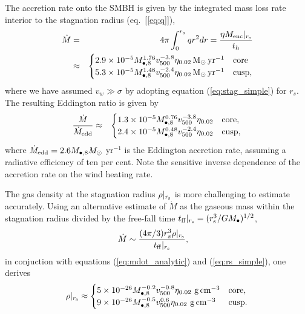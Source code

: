 \documentclass[usenatbib,fleqn]{mn2e}
\newcommand{\rs}{r_s}
\newcommand{\Menc}{M_{\rm enc}}
\newcommand{\Mbheight}{M_{\bullet,8}}
\newcommand{\pyear}{{\rm yr}^{-1}}
\renewcommand{\th}{t_h}
\newcommand{\tff}{t_{\rm ff}}
\begin{document}
The accretion rate onto the SMBH is given by the integrated mass loss rate interior to the stagnation radius (eq.~[\ref{eq:q}]), 
\begin{eqnarray}
  \dot{M} &=& 4\pi \int_{0}^{r_{s}}q r^{2}dr = \frac{\eta \Menc|_{r_{\rm s}}}{\th} \nonumber \\
&\approx&
  \begin{cases}
    2.9 \times 10^{-5} M_{\bullet,8}^{1.76}
    v_{500}^{-3.8}  \eta_{0.02} \Msun \, \pyear& \text{core} \\
    5.3 \times 10^{-5} M_{\bullet,8}^{1.48} 
    v_{500}^{-2.4}  \eta_{0.02} \Msun \, \pyear  & \text{cusp}, 
  \end{cases}
  \label{eq:mdot_analytic}
\end{eqnarray}
where we have assumed $v_{w} \gg \sigma$ by adopting equation (\ref{eq:stag_simple}) for $r_s$.  The resulting Eddington ratio is given by 
\begin{eqnarray}
\frac{\dot{M}}{\dot{M}_{\rm edd}} &\approx&
  \begin{cases}
    1.3 \times 10^{-5} M_{\bullet,8}^{0.76}
    v_{500}^{-3.8}  \eta_{0.02}   & \text{core}, \\
    2.4 \times 10^{-5} \Mbheight^{0.48} 
    v_{500}^{-2.4}  \eta_{0.02}   & \text{cusp}, 
  \end{cases}
  \label{eq:eddr_analytic}
\end{eqnarray}
where $\dot{M}_{\rm edd} = 2.6M_{\bullet,8}M_{\odot}$ yr$^{-1}$  is the Eddington accretion rate, assuming a radiative efficiency of ten per cent.  Note the sensitive inverse dependence of the accretion rate on the wind heating rate.  

The gas density at the stagnation radius $\rho|_{r_{\rm s}}$ is more challenging to estimate accurately.  Using an alternative estimate of $\dot{M}$ as the gaseous mass within the stagnation radius divided by the free-fall time $t_{\rm ff}|_{r_{\rm s}} = (r_{\rm s}^{3}/GM_{\bullet})^{1/2}$,
\begin{align}
  &\dot{M}\sim\frac{(4 \pi/3) \rs^3 \rho|_{r_{\rm s}}}{\tff|_{r_{\rm s}}},
  \label{eq:mdot_gas}
\end{align}
 in conjuction with equations (\ref{eq:mdot_analytic}) and (\ref{eq:rs_simple}), one derives
\begin{align}
  \rho|_{r_{\rm s}}\approx
  \begin{cases}
    5 \times 10^{-26} \Mbheight^{-0.2} v_{500}^{-0.8}  \eta_{0.02} \,
    \, {\rm g \, cm^{-3}}& \text{core},\\
    9 \times 10^{-26}  \Mbheight^{-0.5} v_{500}^{0.6}  \eta_{0.02} \,\, {\rm g \,cm^{-3}} & \text{cusp}.
  \end{cases}
  \label{eq:rhors}
\end{align}
\end{document}
